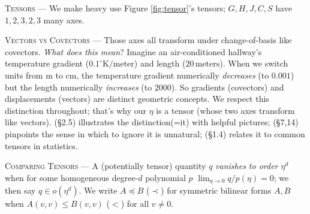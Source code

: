 \documentclass[anon,12pt]{colt2021} %
\begin{document}

            \textsc{Tensors} --- We make heavy use Figure \ref{fig:tensor}'s tensors;
            $G, H, J, C, S$ have $1, 2, 3, 2, 3$ many axes.%

            \textsc{Vectors vs Covectors} --- 
                Those axes all transform under change-of-basis like covectors.
                \emph{What does this mean}?  Imagine an air-conditioned
                hallway's temperature gradient ($0.1^\circ
                \text{K}/\text{meter}$) and length ($20\,\text{meters}$).
                When we switch units from m to cm, the temperature
                gradient numerically \emph{decreases} (to $0.001$) but the length
                numerically \emph{increases} (to $2000$).  So gradients
                (covectors) and displacements (vectors) are distinct geometric
                concepts.  We respect this distinction throughout; that's why our $\eta$ is a tensor (whose two
                axes transform like vectors).
                \cite{mi73} (\S2.5) illustrates the distinction(=it) with
                helpful pictures; \cite{ko93} (\S7,14) pinpoints the sense in
                which to ignore it is unnatural; \cite{cu87} (\S1.4) relates
                it to common tensors in statistics.

            \textsc{Comparing Tensors} --- A (potentially tensor)
            quantity $q$ \emph{vanishes to order $\eta^d$} when
            for some homogeneous degree-$d$ polynomial $p$
            $\lim_{\eta\to 0} q/p(\eta) = 0$; we then say $q\in o(\eta^d)$.
            We write $A \preceq B$ ($\prec$) for symmetric bilinear forms $A,
            B$ when $A(v,v) \leq B(v,v)$ ($<$) for all $v\neq 0$. 
\end{document}
